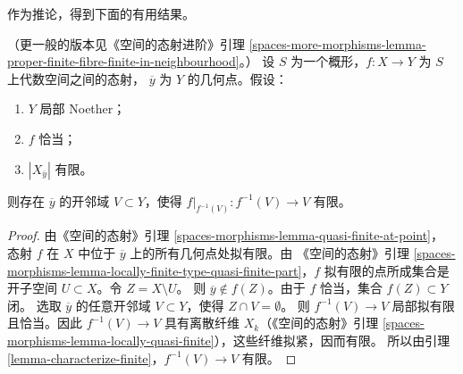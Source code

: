 \noindent
作为推论，得到下面的有用结果。

\begin{lemma}
\label{lemma-proper-finite-fibre-finite-in-neighbourhood}
（更一般的版本见《空间的态射进阶》引理
\ref{spaces-more-morphisms-lemma-proper-finite-fibre-finite-in-neighbourhood}。）
设 $S$ 为一个概形，$f : X \to Y$ 为 $S$ 上代数空间之间的态射，
$\overline{y}$ 为 $Y$ 的几何点。假设：
\begin{enumerate}
\item $Y$ 局部 Noether；
\item $f$ 恰当；
\item $|X_{\overline{y}}|$ 有限。
\end{enumerate}
则存在 $\overline{y}$ 的开邻域 $V \subset Y$，使得
$f|_{f^{-1}(V)} : f^{-1}(V) \to V$ 有限。
\end{lemma}

\begin{proof}
由《空间的态射》引理 \ref{spaces-morphisms-lemma-quasi-finite-at-point}，
态射 $f$ 在 $X$ 中位于 $\overline{y}$ 上的所有几何点处拟有限。由
《空间的态射》引理
\ref{spaces-morphisms-lemma-locally-finite-type-quasi-finite-part}，$f$
拟有限的点所成集合是开子空间 $U \subset X$。令 $Z = X \setminus U$。
则 $\overline{y} \not \in f(Z)$。由于 $f$ 恰当，集合 $f(Z) \subset Y$ 闭。
选取 $\overline{y}$ 的任意开邻域 $V \subset Y$，使得
$Z \cap V = \emptyset$。%
则 $f^{-1}(V) \to V$ 局部拟有限且恰当。因此
$f^{-1}(V) \to V$ 具有离散纤维 $X_k$（《空间的态射》引理
\ref{spaces-morphisms-lemma-locally-quasi-finite}），这些纤维拟紧，因而有限。
所以由引理 \ref{lemma-characterize-finite}，$f^{-1}(V) \to V$ 有限。
\end{proof}










